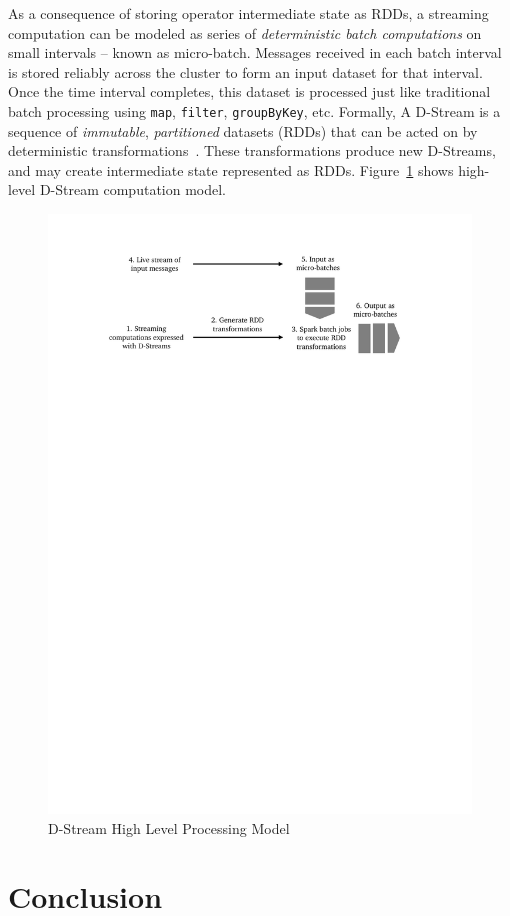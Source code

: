 As a consequence of storing operator intermediate state as RDDs, a streaming computation can be modeled as series of \emph{deterministic batch computations} on small intervals -- known as micro-batch. Messages received in each batch interval is stored reliably across the cluster to form an input dataset for that interval. Once the time interval completes, this dataset is processed just like traditional batch processing using \lstinline$map$, \lstinline$filter$, \lstinline$groupByKey$, etc. Formally, A D-Stream is a sequence of \emph{immutable}, \emph{partitioned} datasets (RDDs) that can be acted on by deterministic transformations~\cite{Zaharia:2013}. These  transformations produce new D-Streams, and may create intermediate state represented as RDDs. Figure~\ref{fig:sp:dstream-high} shows high-level D-Stream computation model.
\begin{figure}[hb]
    \centering
    \includegraphics[clip,trim=3cm 23cm 3.5cm 2.1cm,scale=0.81]{dstream-high.pdf}
    \caption[D-Stream High Level Processing Model]{D-Stream High Level Processing Model}
    \label{fig:sp:dstream-high}
\end{figure}


\section{Conclusion}
\label{sp:conc}

